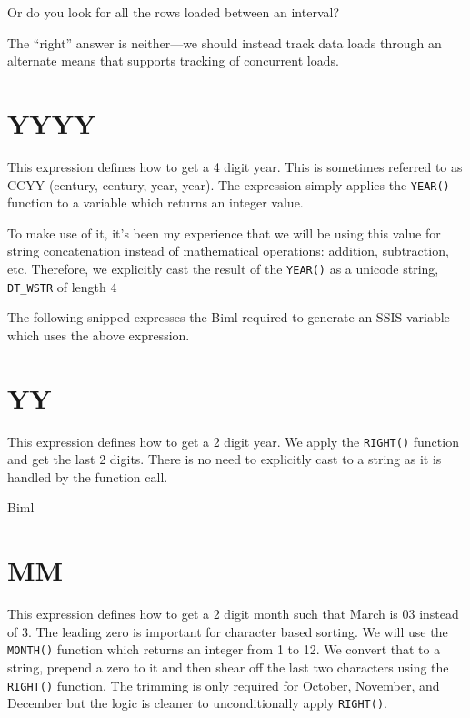 Or do you look for all the rows loaded between an interval?

	
The ``right'' answer is neither---we should instead track data loads through an alternate means that supports tracking of concurrent loads.


\section{YYYY}
\label{sec:YYYY}
This expression defines how to get a 4 digit year. This is sometimes referred to as CCYY (century, century, year, year). The expression simply applies the \verb|YEAR()| function to a variable which returns an integer value. 



To make use of it, it's been my experience that we will be using this value for string concatenation instead of mathematical operations: addition, subtraction, etc. Therefore, we explicitly cast the result of the \verb|YEAR()| as a unicode string, \verb|DT_WSTR| of length 4

The following snipped expresses the Biml required to generate an SSIS variable which uses the above expression.



\section{YY}
\label{sec:YY}
This expression defines how to get a 2 digit year. We apply the \verb|RIGHT()| function and get the last 2 digits. There is no need to explicitly cast to a string as it is handled by the function call.



Biml


\section{MM}
\label{sec:MM}
This expression defines how to get a 2 digit month such that March is 03 instead of 3. The leading zero is important for character based sorting. We will use the \verb|MONTH()| function which returns an integer from 1 to 12. We convert that to a string, prepend a zero to it and then shear off the last two characters using the \verb|RIGHT()| function. The trimming is only required for October, November, and December but the logic is cleaner to unconditionally apply \verb|RIGHT()|.

